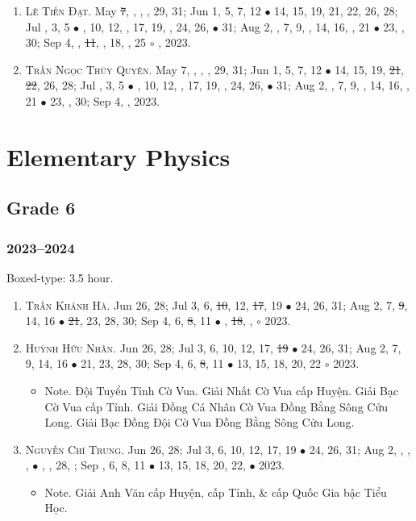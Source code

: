 \documentclass{article}
\begin{document}
\begin{enumerate}
	\item \textsc{Lê Tiến Đạt.} May \st{7}, , , , 29, 31; Jun 1, 5, 7, 12 $\bullet$ 14, 15, 19, 21, 22, 26, 28; Jul , 3, 5 $\bullet$ , 10, 12, , 17, 19, , 24, 26,  $\bullet$ 31; Aug 2, , 7, 9, , 14, 16, , 21 $\bullet$ 23, , 30; Sep 4, , \st{11}, , 18, , 25 $\circ$ , 2023.
	\item \textsc{Trần Ngọc Thúy Quyên.} May 7, , , , 29, 31; Jun 1, 5, 7, 12 $\bullet$ 14, 15, 19, \st{21}, \st{22}, 26, 28; Jul , 3, 5 $\bullet$ , 10, 12, , 17, 19, , 24, 26,  $\bullet$ 31; Aug 2, , 7, 9, , 14, 16, , 21 $\bullet$ 23, , 30; Sep 4, , 2023.
\end{enumerate}


\section{Elementary Physics}

\subsection{Grade 6}

\subsubsection{2023--2024}
Boxed-type: 3.5 hour.
\begin{enumerate}
	\item \textsc{Trần Khánh Hà.} {\sf[In]} Jun 26, 28; Jul 3, 6, \st{10}, 12, \st{17}, 19 $\bullet$ 24, 26, 31; Aug 2, 7, \st{9}, 14, 16 $\bullet$ \st{21}, 23, 28, 30; Sep 4, 6, \st{8}, 11 $\bullet$ , \st{18}, , $\circ$ 2023.
	\item \textsc{Huỳnh Hữu Nhân.} {\sf[In]} Jun 26, 28; Jul 3, 6, 10, 12, 17, \st{19} $\bullet$ 24, 26, 31; Aug 2, 7, 9, 14, 16 $\bullet$ 21, 23, 28, 30; Sep 4, 6, \st{8}, 11 $\bullet$ 13, 15, 18, 20, 22 $\circ$ 2023.
	\begin{itemize}
		\item {\sf Note.} Đội Tuyển Tỉnh Cờ Vua. Giải Nhất Cờ Vua cấp Huyện. Giải Bạc Cờ Vua cấp Tỉnh. Giải Đồng Cá Nhân Cờ Vua Đồng Bằng Sông Cửu Long. Giải Bạc Đồng Đội Cờ Vua Đồng Bằng Sông Cửu Long.
	\end{itemize}
	\item \textsc{Nguyễn Chí Trung.} {\sf[In]} Jun 26, 28; Jul 3, 6, 10, 12, 17, 19 $\bullet$ 24, 26, 31; Aug 2, , , ,  $\bullet$ , , 28, ; Sep , 6, 8, 11 $\bullet$ 13, 15, 18, 20, 22, $\bullet$ 2023.
	\begin{itemize}
		\item {\sf Note.} Giải Anh Văn cấp Huyện, cấp Tỉnh, \& cấp Quốc Gia bậc Tiểu Học.
	\end{itemize}
\end{enumerate}
\end{document}

